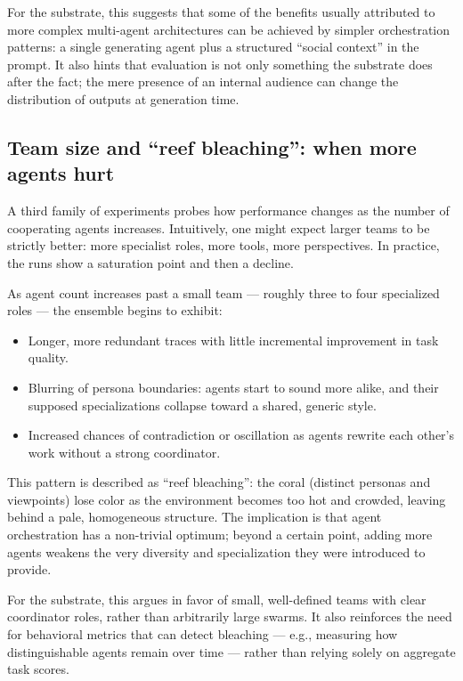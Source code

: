 \documentclass{article}
\providecommand{\tightlist}{\setlength{\itemsep}{0pt}\setlength{\parskip}{0pt}}
\begin{document}
For the substrate, this suggests that some of the benefits usually
attributed to more complex multi-agent architectures can be achieved by
simpler orchestration patterns: a single generating agent plus a
structured ``social context'' in the prompt. It also hints that
evaluation is not only something the substrate does after the fact; the
mere presence of an internal audience can change the distribution of
outputs at generation time.

\subsection{Team size and ``reef bleaching'': when more agents
hurt}\label{team-size-and-reef-bleaching-when-more-agents-hurt}

A third family of experiments probes how performance changes as the
number of cooperating agents increases. Intuitively, one might expect
larger teams to be strictly better: more specialist roles, more tools,
more perspectives. In practice, the runs show a saturation point and
then a decline.

As agent count increases past a small team --- roughly three to four
specialized roles --- the ensemble begins to exhibit:

\begin{itemize}
\tightlist
\item
  Longer, more redundant traces with little incremental improvement in
  task quality.
\item
  Blurring of persona boundaries: agents start to sound more alike, and
  their supposed specializations collapse toward a shared, generic
  style.
\item
  Increased chances of contradiction or oscillation as agents rewrite
  each other's work without a strong coordinator.
\end{itemize}

This pattern is described as ``reef bleaching'': the coral (distinct
personas and viewpoints) lose color as the environment becomes too hot
and crowded, leaving behind a pale, homogeneous structure. The
implication is that agent orchestration has a non-trivial optimum;
beyond a certain point, adding more agents weakens the very diversity
and specialization they were introduced to provide.

For the substrate, this argues in favor of small, well-defined teams
with clear coordinator roles, rather than arbitrarily large swarms. It
also reinforces the need for behavioral metrics that can detect
bleaching --- e.g., measuring how distinguishable agents remain over
time --- rather than relying solely on aggregate task scores.
\end{document}
